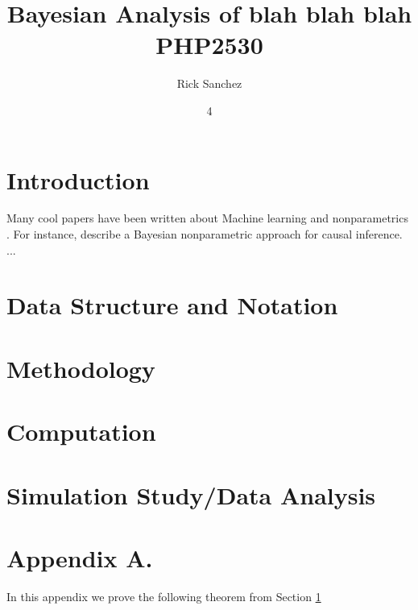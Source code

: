\documentclass[twoside,11pt]{article}
\begin{document}
\title{	Bayesian Analysis of blah blah blah \\
\vspace{.1in}
PHP2530			
}

\author{ Rick Sanchez  }

\maketitle
\date{4 }

\section{Introduction} \label{sc:intro}

Many cool papers have been written about Machine learning and nonparametrics \citep{Breiman2001}.  For instance, \citet{Hill2011}  describe a Bayesian nonparametric approach for causal inference.
...

\section{Data Structure and Notation} \label{sc:data}

\section{Methodology} \label{sc:methods}

\section{Computation} \label{sc:comp}

\section{Simulation Study/Data Analysis} \label{sc:comp}


\newpage

\appendix
\section*{Appendix A.} \label{sc:app_a}
In this appendix we prove the following theorem from
Section \ref{sc:intro}


\newpage 

\end{document}
